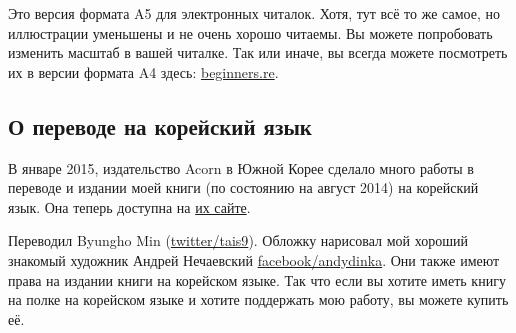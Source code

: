 



\ifdefined\ebook
Это версия формата A5 для электронных читалок.
Хотя, тут всё то же самое, но иллюстрации уменьшены и не очень хорошо читаемы.
Вы можете попробовать изменить масштаб в вашей читалке.
Так или иначе, вы всегда можете посмотреть их в версии формата A4 здесь:
\href{http://go.yurichev.com/17009}{beginners.re}.
\fi

\subsection*{О переводе на корейский язык}

В январе 2015, издательство Acorn в Южной Корее сделало много работы в переводе 
и издании моей книги (по состоянию на август 2014) на корейский язык.
Она теперь доступна на \href{http://go.yurichev.com/17343}{их сайте}.

Переводил Byungho Min (\href{http://go.yurichev.com/17344}{twitter/tais9}).
Обложку нарисовал мой хороший знакомый художник Андрей Нечаевский
\href{http://go.yurichev.com/17023}{facebook/andydinka}.
Они также имеют права на издании книги на корейском языке.
Так что если вы хотите иметь  книгу на полке на корейском языке и
хотите поддержать мою работу, вы можете купить её.
